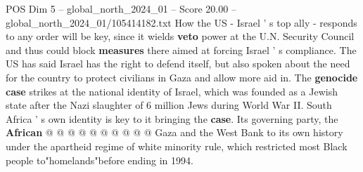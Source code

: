\begin{textsample}{POS Dim 5 – global\_north\_2024\_01 – Score 20.00 – global\_north\_2024\_01/105414182.txt}
How the US - Israel ' s top ally - responds to any order will be key, since it wields \textbf{veto} power at the U.N.
Security Council and thus could block \textbf{measures} there aimed at forcing Israel ' s compliance.
The US has said Israel has the right to defend itself, but also spoken about the need for the country to protect civilians in Gaza and allow more aid in.
The \textbf{genocide} \textbf{case} strikes at the national identity of Israel, which was founded as a Jewish state after the Nazi slaughter of 6 million Jews during World War II.
South Africa ' s own identity is key to it bringing the \textbf{case}.
Its governing party, the \textbf{African} @ @ @ @ @ @ @ @ @ @ Gaza and the West Bank to its own history under the apartheid regime of white minority rule, which restricted most Black people to"homelands"before ending in 1994.

\end{textsample}
